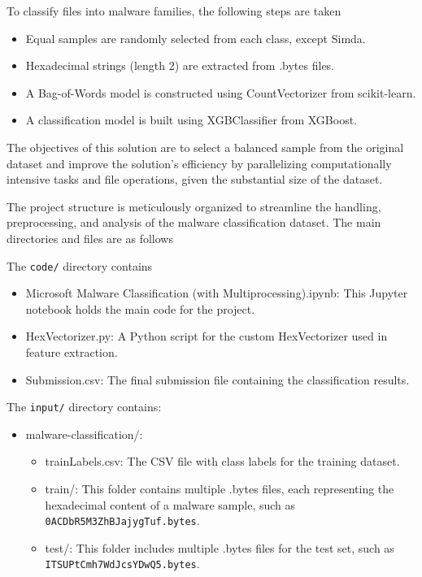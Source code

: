 \documentclass[conference]{IEEEtran}
\begin{document}
To classify files into malware families, the following steps are taken

\begin{itemize}
    \item Equal samples are randomly selected from each class, except Simda.
    \item Hexadecimal strings (length 2) are extracted from .bytes files.
    \item A Bag-of-Words model is constructed using CountVectorizer from scikit-learn.
    \item A classification model is built using XGBClassifier from XGBoost.
\end{itemize}

The objectives of this solution are to select a balanced sample from the original dataset and improve the solution's efficiency by parallelizing computationally intensive tasks and file operations, given the substantial size of the dataset.

The project structure is meticulously organized to streamline the handling, preprocessing, and analysis of the malware classification dataset. The main directories and files are as follows

The \texttt{code/} directory contains
\begin{itemize}
    \item Microsoft Malware Classification (with Multiprocessing).ipynb: This Jupyter notebook holds the main code for the project.
    \item HexVectorizer.py: A Python script for the custom HexVectorizer used in feature extraction.
    \item Submission.csv: The final submission file containing the classification results.
\end{itemize}

The \texttt{input/} directory contains:
\begin{itemize}
    \item malware-classification/:
        \begin{itemize}
            \item trainLabels.csv: The CSV file with class labels for the training dataset.
            \item train/: This folder contains multiple .bytes files, each representing the hexadecimal content of a malware sample, such as \texttt{0ACDbR5M3ZhBJajygTuf.bytes}.
            \item test/: This folder includes multiple .bytes files for the test set, such as \texttt{ITSUPtCmh7WdJcsYDwQ5.bytes}.
        \end{itemize}
\end{itemize}
\end{document}
